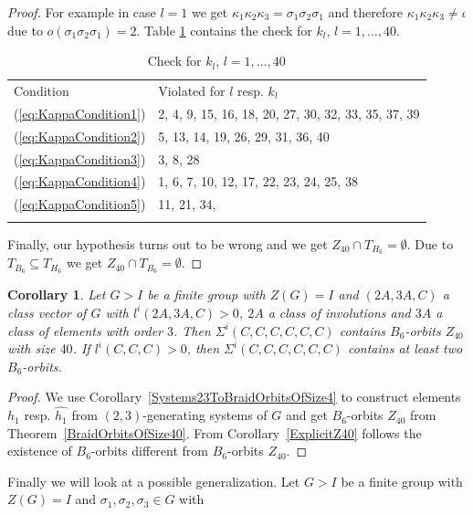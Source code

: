 \documentclass[12pt,a4paper]{article}
\newtheorem{corollary}{Corollary}[section]
\numberwithin{equation}{section}
\numberwithin{table}{section}
\begin{document}
\begin{proof}
For example in case $l=1$ we get
$\kappa_1 \kappa_2 \kappa_3 = \sigma_1 \sigma_2 \sigma_1$ and therefore $\kappa_1 \kappa_2 \kappa_3 \neq \iota$
due to $o(\sigma_1 \sigma_2 \sigma_1)=2$.
Table \ref{tab:ConditionCheckForkl} contains the check for $k_l$, $l = 1, \dots, 40$.
%
\begin{table}[h!]
\centering
\footnotesize
\captionsetup{font=footnotesize}
\caption{Check for $k_l$, $l = 1, \dots, 40$}
\label{tab:ConditionCheckForkl}
\begin{tabular}{ll}
\hline\noalign{\smallskip}
Condition        & Violated for $l$ resp. $k_l$ \\
\noalign{\smallskip}\hline\noalign{\smallskip}
(\ref{eq:KappaCondition1}) & 2, 4, 9, 15, 16, 18, 20, 27, 30, 32, 33, 35, 37, 39 \\
(\ref{eq:KappaCondition2}) & 5, 13, 14, 19, 26, 29, 31, 36, 40 \\
(\ref{eq:KappaCondition3}) & 3, 8, 28 \\
(\ref{eq:KappaCondition4}) & 1, 6, 7, 10, 12, 17, 22, 23, 24, 25, 38 \\
(\ref{eq:KappaCondition5}) & 11, 21, 34, \\
\noalign{\smallskip}\hline
\end{tabular}
\end{table}
%
Finally, our hypothesis turns out to be wrong and we get $Z_{40} \cap T_{H_6} = \emptyset$.
Due to $T_{B_6} \subseteq T_{H_6}$ we get $Z_{40} \cap T_{B_6} = \emptyset$.
\end{proof}
%
\begin{corollary}
\label{Systems23ToBraidOrbitsOfSize40}
Let $G>I$ be a finite group with $Z(G)=I$ and $(2A,3A,C)$ a class vector of $G$ with $l^i(2A,3A,C)>0$,
$2A$ a class of involutions and $3A$ a class of elements with order $3$.
Then $\Sigma^i(C,C,C,C,C,C)$ contains $B_6$-orbits $Z_{40}$ with size $40$.
If $l^i(C,C,C) > 0$, then $\Sigma^i(C,C,C,C,C,C)$ contains at least two $B_6$-orbits.
\end{corollary}
\begin{proof}
We use Corollary~\ref{Systems23ToBraidOrbitsOfSize4} to construct elements $h_1$ resp. $\widehat{h_1}$
from $(2,3)$-generating systems of $G$ and get $B_6$-orbits $Z_{40}$ from Theorem~\ref{BraidOrbitsOfSize40}.
From Corollary~\ref{ExplicitZ40} follows the existence of $B_6$-orbits different from $B_6$-orbits $Z_{40}$.
\end{proof}
\noindent
Finally we will look at a possible generalization.
Let $G>I$ be a finite group with $Z(G)=I$ and $\sigma_1, \sigma_2, \sigma_3 \in G$ with
\end{document}
